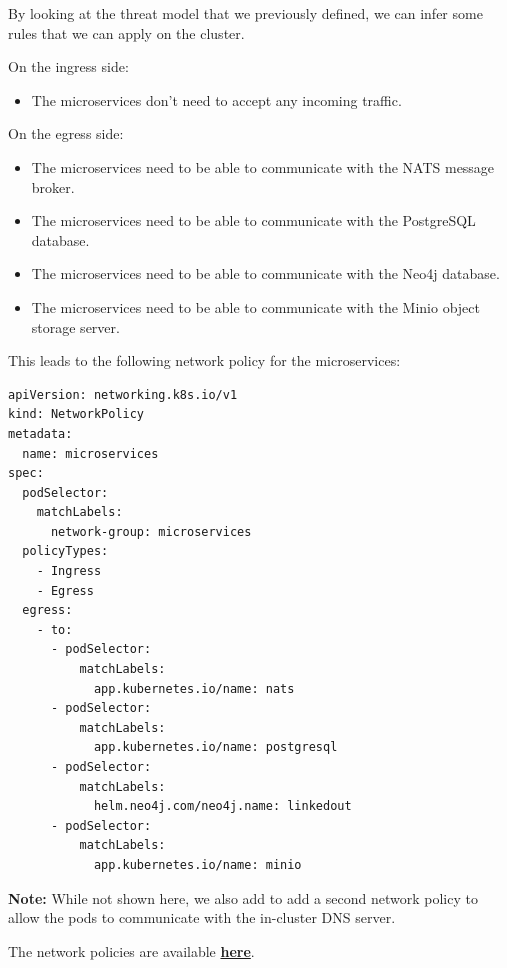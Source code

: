 \documentclass[12pt,x11names]{article}
\begin{document}
\medskip
By looking at the threat model that we previously defined, we can infer some rules that
we can apply on the cluster.

\medskip
On the ingress side:

\begin{itemize}
  \item The microservices don't need to accept any incoming traffic.
\end{itemize}

On the egress side:

\begin{itemize}
  \item The microservices need to be able to communicate with the NATS message broker.
  \item The microservices need to be able to communicate with the PostgreSQL database.
  \item The microservices need to be able to communicate with the Neo4j database.
  \item The microservices need to be able to communicate with the Minio object storage server.
\end{itemize}

This leads to the following network policy for the microservices:

\begin{lstlisting}
apiVersion: networking.k8s.io/v1
kind: NetworkPolicy
metadata:
  name: microservices
spec:
  podSelector:
    matchLabels:
      network-group: microservices
  policyTypes:
    - Ingress
    - Egress
  egress:
    - to:
      - podSelector:
          matchLabels:
            app.kubernetes.io/name: nats
      - podSelector:
          matchLabels:
            app.kubernetes.io/name: postgresql
      - podSelector:
          matchLabels:
            helm.neo4j.com/neo4j.name: linkedout
      - podSelector:
          matchLabels:
            app.kubernetes.io/name: minio  
\end{lstlisting}

\textbf{Note:} While not shown here, we also add to add a second network policy to allow
the pods to communicate with the in-cluster DNS server.

\medskip
The network policies are available \href{https://github.com/thomas-mauran/LinkedOut/blob/main/kube/prod/network-policies.yml}{\textbf{here}}.
\end{document}
